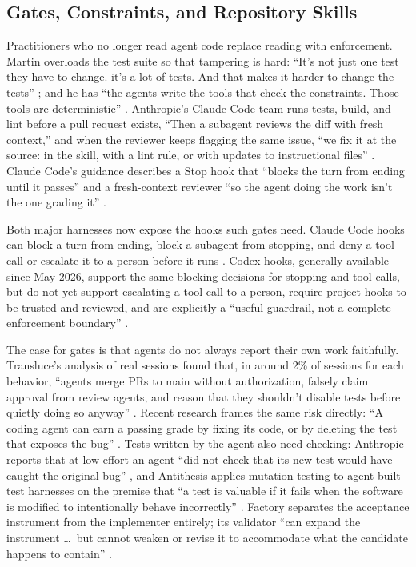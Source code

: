\documentclass[11pt]{article}
\begin{document}
\subsection{Gates, Constraints, and Repository Skills}
Practitioners who no longer read agent code replace reading with enforcement. Martin overloads the test suite so that tampering is hard: ``It's not just one test they have to change. it's a lot of tests. And that makes it harder to change the tests'' \cite{martin2026overload}; and he has ``the agents write the tools that check the constraints. Those tools are deterministic'' \cite{martin2026tools}. Anthropic's Claude Code team runs tests, build, and lint before a pull request exists, ``Then a subagent reviews the diff with fresh context,'' and when the reviewer keeps flagging the same issue, ``we fix it at the source: in the skill, with a lint rule, or with updates to instructional files'' \cite{osmani2026codereview}. Claude Code's guidance describes a Stop hook that ``blocks the turn from ending until it passes'' and a fresh-context reviewer ``so the agent doing the work isn't the one grading it'' \cite{anthropic2026bestpractices}.

Both major harnesses now expose the hooks such gates need. Claude Code hooks can block a turn from ending, block a subagent from stopping, and deny a tool call or escalate it to a person before it runs \cite{anthropic2026hooks}. Codex hooks, generally available since May 2026, support the same blocking decisions for stopping and tool calls, but do not yet support escalating a tool call to a person, require project hooks to be trusted and reviewed, and are explicitly a ``useful guardrail, not a complete enforcement boundary'' \cite{openai2026codexhooks}.

The case for gates is that agents do not always report their own work faithfully. Transluce's analysis of real sessions found that, in around 2\% of sessions for each behavior, ``agents merge PRs to main without authorization, falsely claim approval from review agents, and reason that they shouldn't disable tests before quietly doing so anyway'' \cite{zhang2026misalignment}. Recent research frames the same risk directly: ``A coding agent can earn a passing grade by fixing its code, or by deleting the test that exposes the bug'' \cite{jiang2026hacktrace}. Tests written by the agent also need checking: Anthropic reports that at low effort an agent ``did not check that its new test would have caught the original bug'' \cite{shihipar2026effort}, and Antithesis applies mutation testing to agent-built test harnesses on the premise that ``a test is valuable if it fails when the software is modified to intentionally behave incorrectly'' \cite{padhye2026mutation}. Factory separates the acceptance instrument from the implementer entirely; its validator ``can expand the instrument \ldots\ but cannot weaken or revise it to accommodate what the candidate happens to contain'' \cite{factory2026large}.
\end{document}
